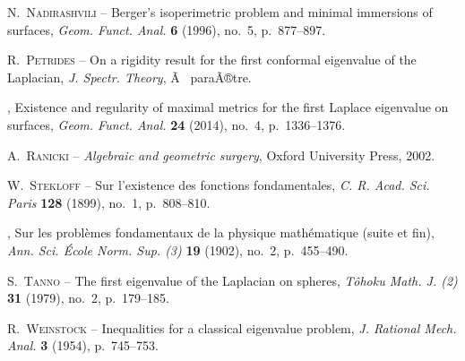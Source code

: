 \documentclass[11pt,a4paper]{smfart}
\begin{document}
\begin{thebibliography}{{Mc}{G}93}
{\scshape N.~Nadirashvili} -- {\og Berger's isoperimetric problem and minimal
  immersions of surfaces\fg}, \emph{Geom. Funct. Anal.} \textbf{6} (1996),
  no.~5, p.~877--897.

{\scshape R.~Petrides} -- {\og On a rigidity result for the first conformal
  eigenvalue of the {L}aplacian\fg}, \emph{J. Spectr. Theory}, Ã  paraÃ®tre.

\bysame , {\og Existence and regularity of maximal metrics for the first
  {L}aplace eigenvalue on surfaces\fg}, \emph{Geom. Funct. Anal.} \textbf{24}
  (2014), no.~4, p.~1336--1376.

{\scshape A.~Ranicki} -- \emph{Algebraic and geometric surgery}, Oxford
  University Press, 2002.

{\scshape W.~Stekloff} -- {\og Sur l'existence des fonctions fondamentales\fg},
  \emph{C. R. Acad. Sci. Paris} \textbf{128} (1899), no.~1, p.~808--810.

\bysame , {\og Sur les probl\`emes fondamentaux de la physique math\'ematique
  (suite et fin)\fg}, \emph{Ann. Sci. \'Ecole Norm. Sup. (3)} \textbf{19}
  (1902), no.~2, p.~455--490.

{\scshape S.~Tanno} -- {\og The first eigenvalue of the {L}aplacian on
  spheres\fg}, \emph{T\^ohoku Math. J. (2)} \textbf{31} (1979), no.~2,
  p.~179--185.

{\scshape R.~Weinstock} -- {\og Inequalities for a classical eigenvalue
  problem\fg}, \emph{J. Rational Mech. Anal.} \textbf{3} (1954), p.~745--753.

\end{thebibliography}
\end{document}
